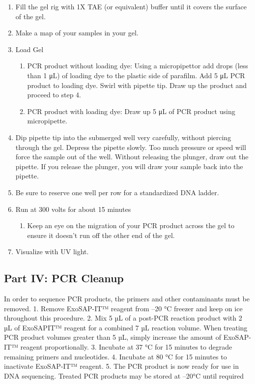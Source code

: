 \documentclass[
  letterpaper,
  DIV=11,
  numbers=noendperiod]{scrreprt}
\providecommand{\tightlist}{%
  \setlength{\itemsep}{0pt}\setlength{\parskip}{0pt}}
\begin{document}
\begin{enumerate}
\def\labelenumi{\arabic{enumi}.}
\tightlist
\item
  Fill the gel rig with 1X TAE (or equivalent) buffer until it covers
  the surface of the gel.
\item
  Make a map of your samples in your gel.
\item
  Load Gel

  \begin{enumerate}
  \def\labelenumii{\alph{enumii}.}
  \tightlist
  \item
    PCR product without loading dye: Using a micropipettor add drops
    (less than 1 μL) of loading dye to the plastic side of parafilm. Add
    5 μL PCR product to loading dye. Swirl with pipette tip. Draw up the
    product and proceed to step 4.
  \item
    PCR product with loading dye: Draw up 5 μL of PCR product using
    micropipette.
  \end{enumerate}
\item
  Dip pipette tip into the submerged well very carefully, without
  piercing through the gel. Depress the pipette slowly. Too much
  pressure or speed will force the sample out of the well. Without
  releasing the plunger, draw out the pipette. If you release the
  plunger, you will draw your sample back into the pipette.
\item
  Be sure to reserve one well per row for a standardized DNA ladder.
\item
  Run at 300 volts for about 15 minutes

  \begin{enumerate}
  \def\labelenumii{\alph{enumii}.}
  \tightlist
  \item
    Keep an eye on the migration of your PCR product across the gel to
    ensure it doesn't run off the other end of the gel.
  \end{enumerate}
\item
  Visualize with UV light.
\end{enumerate}

\subsection*{Part IV: PCR Cleanup}\label{part-iv-pcr-cleanup}

In order to sequence PCR products, the primers and other contaminants
must be removed. 1. Remove ExoSAP-IT™ reagent from --20 °C freezer and
keep on ice throughout this procedure. 2. Mix 5 µL of a post-PCR
reaction product with 2 µL of ExoSAPIT™ reagent for a combined 7 µL
reaction volume. When treating PCR product volumes greater than 5 µL,
simply increase the amount of ExoSAP-IT™ reagent proportionally. 3.
Incubate at 37 °C for 15 minutes to degrade remaining primers and
nucleotides. 4. Incubate at 80 °C for 15 minutes to inactivate
ExoSAP-IT™ reagent. 5. The PCR product is now ready for use in DNA
sequencing. Treated PCR products may be stored at --20°C until required
\end{document}
